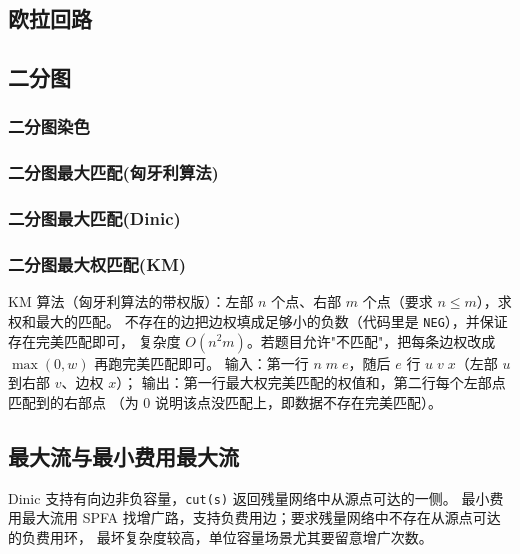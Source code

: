 \documentclass[11pt,a4paper,twocolumn]{ctexart}  %
\begin{document}
\subsection{欧拉回路}




\subsection{二分图}

\subsubsection{二分图染色}

\subsubsection{二分图最大匹配(匈牙利算法)}

\subsubsection{二分图最大匹配(Dinic)}

\subsubsection{二分图最大权匹配(KM)}
KM 算法（匈牙利算法的带权版）：左部 $n$ 个点、右部 $m$ 个点（要求 $n \le m$），求权和最大的匹配。
不存在的边把边权填成足够小的负数（代码里是 \texttt{NEG}），并保证存在完美匹配即可，
复杂度 $O(n^2 m)$。若题目允许"不匹配"，把每条边权改成 $\max(0, w)$ 再跑完美匹配即可。
输入：第一行 $n\;m\;e$，随后 $e$ 行 $u\;v\;x$（左部 $u$ 到右部 $v$、边权 $x$）；
输出：第一行最大权完美匹配的权值和，第二行每个左部点匹配到的右部点
（为 0 说明该点没匹配上，即数据不存在完美匹配）。


\subsection{最大流与最小费用最大流}
Dinic 支持有向边非负容量，\texttt{cut(s)} 返回残量网络中从源点可达的一侧。
最小费用最大流用 SPFA 找增广路，支持负费用边；要求残量网络中不存在从源点可达的负费用环，
最坏复杂度较高，单位容量场景尤其要留意增广次数。


\end{document}
